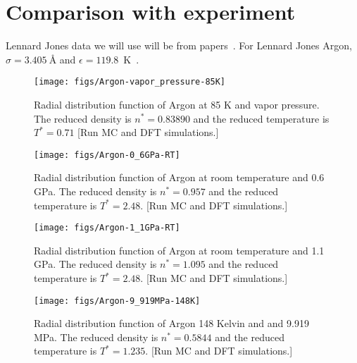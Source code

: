 \documentclass[letterpaper,twocolumn,amsmath,amssymb,prb]{revtex4-1}
\newcommand{\red}[1]{{\color{red} #1}}
\newcommand{\fixme}[1]{\red{[#1]}}
\begin{document}
\section{Comparison with experiment}

Lennard Jones data we will use will be from
papers~\cite{mikolaj2004structure, eggert2002quantitative, yarnell1973structure}.
For Lennard Jones Argon, $\sigma = 3.405 ~\textrm{\AA}$ and $\epsilon = 119.8$~K~\cite{verlet1967computer}.
\begin{figure}
\begin{center}
\texttt{[image: figs/Argon-vapor\_pressure-85K]}
\end{center}
\caption{Radial distribution function of Argon at 85 K and vapor
  pressure.  The reduced density is $n^* = 0.83890$ and the reduced
  temperature is $T^* = 0.71$ \fixme{Run MC and DFT simulations.}}
\label{fig:argon-85K}
\end{figure}

\begin{figure}
\begin{center}
\texttt{[image: figs/Argon-0\_6GPa-RT]}
\end{center}
\caption{Radial distribution function of Argon at room temperature and
0.6 GPa.  The reduced density is $n^* = 0.957$ and the reduced
temperature is $T^* = 2.48$. \fixme{Run MC and DFT simulations.}}
\label{fig:argon-0.6GPa}
\end{figure}

\begin{figure}
\begin{center}
\texttt{[image: figs/Argon-1\_1GPa-RT]}
\end{center}
\caption{Radial distribution function of Argon at room temperature and
1.1 GPa.  The reduced density is $n^* = 1.095$ and the reduced
temperature is $T^* = 2.48$. \fixme{Run MC and DFT simulations.}}
\label{fig:argon-1.1GPa}
\end{figure}

\begin{figure}
\begin{center}
\texttt{[image: figs/Argon-9\_919MPa-148K]}
\end{center}
\caption{Radial distribution function of Argon 148 Kelvin and and
9.919 MPa.  The reduced density is $n^* = 0.5844$ and the reduced
temperature is $T^* = 1.235$.\fixme{Run MC and DFT simulations.}}
\label{fig:argon-1.1GPa}
\end{figure}
\end{document}

